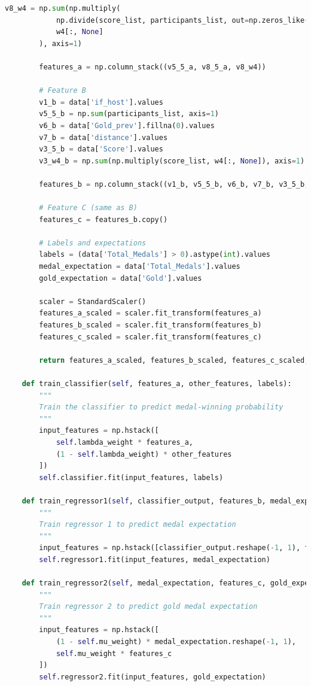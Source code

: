 \documentclass[12pt]{article}
\begin{document}
\begin{lstlisting}[language=Python, style=mystyle, caption=model.ipynb]
        v8_w4 = np.sum(np.multiply(
            np.divide(score_list, participants_list, out=np.zeros_like(score_list, dtype=np.float64), where=participants_list > 0),
            w4[:, None]
        ), axis=1)

        features_a = np.column_stack((v5_5_a, v8_5_a, v8_w4))

        # Feature B
        v1_b = data['if_host'].values
        v5_5_b = np.sum(participants_list, axis=1)
        v6_b = data['Gold_prev'].fillna(0).values
        v7_b = data['distance'].values
        v3_5_b = data['Score'].values
        v3_w4_b = np.sum(np.multiply(score_list, w4[:, None]), axis=1)

        features_b = np.column_stack((v1_b, v5_5_b, v6_b, v7_b, v3_5_b, v3_w4_b))

        # Feature C (same as B)
        features_c = features_b.copy()

        # Labels and expectations
        labels = (data['Total_Medals'] > 0).astype(int).values
        medal_expectation = data['Total_Medals'].values
        gold_expectation = data['Gold'].values

        scaler = StandardScaler()
        features_a_scaled = scaler.fit_transform(features_a)
        features_b_scaled = scaler.fit_transform(features_b)
        features_c_scaled = scaler.fit_transform(features_c)

        return features_a_scaled, features_b_scaled, features_c_scaled, labels, medal_expectation, gold_expectation

    def train_classifier(self, features_a, other_features, labels):
        """
        Train the classifier to predict medal-winning probability
        """
        input_features = np.hstack([
            self.lambda_weight * features_a,
            (1 - self.lambda_weight) * other_features
        ])
        self.classifier.fit(input_features, labels)

    def train_regressor1(self, classifier_output, features_b, medal_expectation):
        """
        Train regressor 1 to predict medal expectation
        """
        input_features = np.hstack([classifier_output.reshape(-1, 1), features_b])
        self.regressor1.fit(input_features, medal_expectation)

    def train_regressor2(self, medal_expectation, features_c, gold_expectation):
        """
        Train regressor 2 to predict gold medal expectation
        """
        input_features = np.hstack([
            (1 - self.mu_weight) * medal_expectation.reshape(-1, 1),
            self.mu_weight * features_c
        ])
        self.regressor2.fit(input_features, gold_expectation)


\end{lstlisting}
\end{document}
